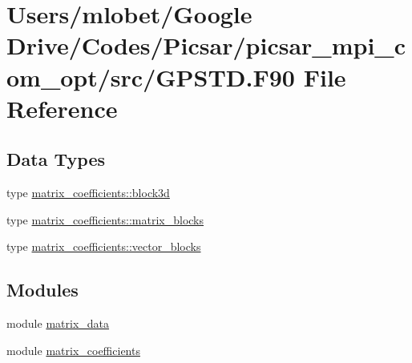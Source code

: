 \hypertarget{_g_p_s_t_d_8_f90}{}\section{Users/mlobet/\+Google Drive/\+Codes/\+Picsar/picsar\+\_\+mpi\+\_\+com\+\_\+opt/src/\+G\+P\+S\+TD.F90 File Reference}
\label{_g_p_s_t_d_8_f90}
\subsection*{Data Types}
\begin{DoxyCompactItemize}
\item 
type \hyperlink{structmatrix__coefficients_1_1block3d}{matrix\+\_\+coefficients\+::block3d}
\item 
type \hyperlink{structmatrix__coefficients_1_1matrix__blocks}{matrix\+\_\+coefficients\+::matrix\+\_\+blocks}
\item 
type \hyperlink{structmatrix__coefficients_1_1vector__blocks}{matrix\+\_\+coefficients\+::vector\+\_\+blocks}
\end{DoxyCompactItemize}
\subsection*{Modules}
\begin{DoxyCompactItemize}
\item 
module \hyperlink{namespacematrix__data}{matrix\+\_\+data}
\item 
module \hyperlink{namespacematrix__coefficients}{matrix\+\_\+coefficients}
\end{DoxyCompactItemize}
